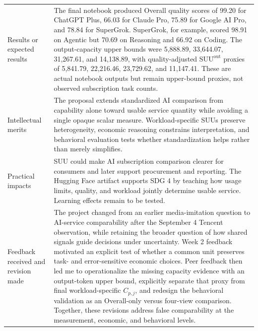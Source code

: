 \documentclass[sigconf,nonacm]{acmart}
\begin{document}
\begin{table}[H]
\begin{tabularx}{
\textwidth
}{
@{}
p{}
Y
@{}
}
Results or expected results
&
The final notebook produced Overall quality scores of 99.20 for ChatGPT Plus,
66.03 for Claude Pro, 75.89 for Google AI Pro, and 78.84 for SuperGrok.
SuperGrok, for example, scored 98.91 on Agentic but 70.69 on Reasoning and
66.92 on Coding. The output-capacity upper bounds were 5,888.89, 33,644.07,
31,267.61, and 14,138.89, with quality-adjusted
$\mathrm{SUU}^{\mathrm{out}}$ proxies of 5,841.79, 22,216.46, 23,729.62,
and 11,147.41. These are actual notebook outputs but remain upper-bound proxies,
not observed subscription task counts.
\\

Intellectual merits
&
The proposal extends standardized AI comparison from capability alone toward
usable service quantity while avoiding a single opaque scalar measure.
Workload-specific SUUs preserve heterogeneity,
economic reasoning constrains interpretation,
and behavioral evaluation tests whether standardization helps rather than
merely simplifies.
\\

Practical impacts
&
SUU could make AI subscription comparison clearer for consumers and later
support procurement and reporting.
The Hugging Face artifact supports SDG 4 by teaching how usage limits,
quality,
and workload jointly determine usable service.
Learning effects remain to be tested.
\\

Feedback received and revision made
&
The project changed from an earlier media-imitation question to AI-service
comparability after the September 4 Tencent observation, while retaining the
broader question of how shared signals guide decisions under uncertainty.
Week 2 feedback motivated an explicit test of whether a common unit preserves
task- and error-sensitive economic choices.
Peer feedback then led me to operationalize the missing capacity evidence with
an output-token upper bound, explicitly separate that proxy from final
workload-specific $C_{p,j}$, and redesign the behavioral validation as an
Overall-only versus four-view comparison.
Together, these revisions address false comparability at the measurement,
economic, and behavioral levels.
\\

\bottomrule

\end{tabularx}

\end{table}
\end{document}
